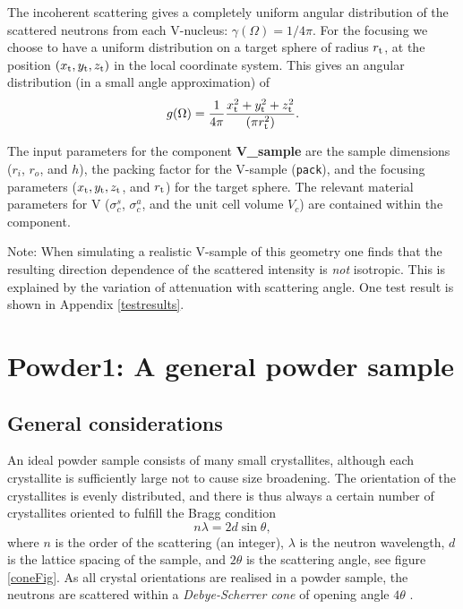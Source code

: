 The incoherent scattering gives
a completely uniform angular distribution of the scattered
neutrons from each V-nucleus: $\gamma(\Omega) = 1/4\pi$.
For the focusing we choose to have a uniform distribution on
a target sphere of radius $r_{\rm t}$, at the position 
$(x_{\rm t},y_{\rm t},z_{\rm t})$
in the local coordinate system.
This gives an angular distribution (in a small angle approximation)
of 
\begin{equation}
g(\Omega) = \frac{1}{4\pi} 
  \frac{x_{\rm t}^2+y_{\rm t}^2+z_{\rm t}^2}{(\pi r_{\rm t}^2)}.
\end{equation}

The input parameters for the component {\bf V\_sample} are
the sample dimensions ($r_i$, $r_o$, and $h$),
the packing factor for the V-sample (\verb+pack+),
and the focusing parameters ($x_{\rm t}, y_{\rm t}, z_{\rm t}$, 
and $r_{\rm t}$) for the target sphere. 
The relevant material parameters for V
($\sigma_c^s$, $\sigma_c^a$, and the unit cell volume $V_c$) 
are contained within the component.

Note: When simulating a realistic V-sample of this geometry
one finds that  the resulting direction dependence 
of the scattered intensity is {\em not} isotropic.
This is explained by the variation of attenuation with
scattering angle.
One test result is shown in Appendix \ref{testresults}.

\section{Powder1: A general powder sample}
\subsection{General considerations}
An ideal powder sample consists of many small
crystallites, although each crystallite is sufficiently
large not to cause size broadening.
The orientation of the crystallites is evenly distributed,
and there is thus always a certain number of
crystallites oriented to fulfill the Bragg condition
\begin{equation}   \label{Bragg}
n \lambda = 2 d \sin \theta ,
\end{equation}
where $n$ is the order of the scattering (an integer), $\lambda$
is the neutron wavelength, $d$ is the lattice spacing of the sample,
and $2 \theta$ is the scattering angle, see figure \ref{coneFig}.
As all crystal orientations
are realised in a powder sample, the neutrons are scattered within a
{\em Debye-Scherrer cone} of opening angle $4 \theta$ \cite{bacon}.


